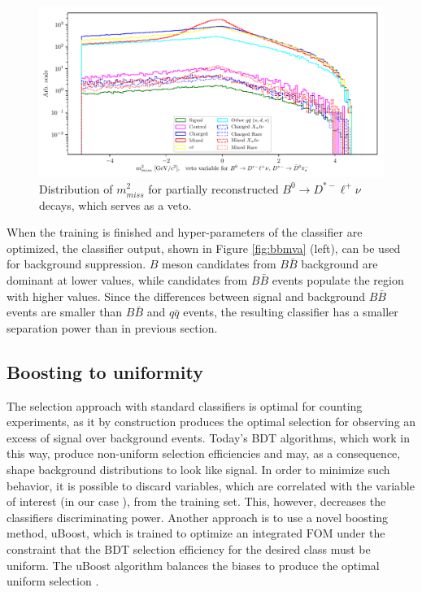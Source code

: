 \begin{figure}[H]
\centering
\captionsetup{width=0.8\linewidth}
\includegraphics[width=\linewidth]{fig/bb_partial_veto}
\caption{Distribution of $m_{miss}^2$ for partially reconstructed $B^0 \to D^{*-} \ell^+ \nu$ decays, which serves as a veto.}
\label{fig:vetoplot}
\end{figure}

When the training is finished and hyper-parameters of the classifier are optimized, the classifier output, shown in Figure \ref{fig:bbmva} (left), can be used for background suppression. $B$ meson candidates from $B \bar B$ background are dominant at lower values, while candidates from $B \bar B$ events populate the region with higher values. Since the differences between signal and background $B \bar B$ events are smaller than $B \bar B$ and $q \bar q$ events, the resulting classifier has a smaller separation power than in previous section.

\subsection{Boosting to uniformity}
The selection approach with standard classifiers is optimal for counting experiments, as it by construction produces the optimal selection for observing an excess of signal over background events. Today's BDT algorithms, which work in this way, produce non-uniform selection efficiencies and may, as a consequence, shape background distributions to look like signal. In order to minimize such behavior, it is possible to discard variables, which are correlated with the variable of interest (in our case \vars), from the training set. This, however, decreases the classifiers discriminating power. Another approach is to use a novel boosting method, uBoost, which is trained to optimize an integrated $\mathrm{FOM}$ under the constraint that the BDT selection efficiency for the desired class must be uniform. The uBoost algorithm balances the biases to produce the optimal uniform selection \cite{stevens2013uboost}.

